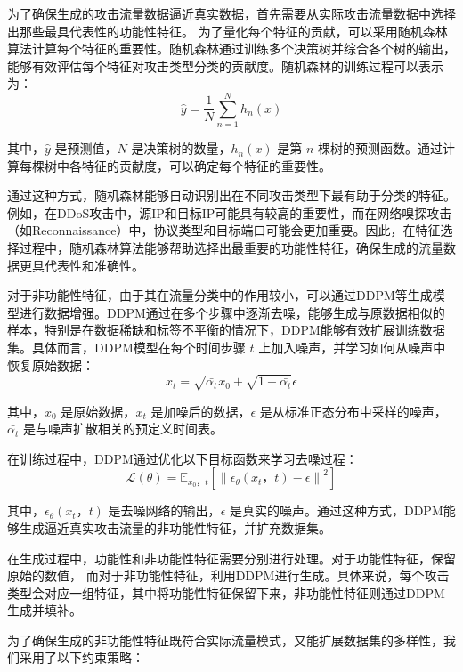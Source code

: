 \documentclass[promaster]{thesis-uestc}
\begin{document}
为了确保生成的攻击流量数据逼近真实数据，首先需要从实际攻击流量数据中选择出那些最具代表性的功能性特征。
为了量化每个特征的贡献，可以采用随机森林算法计算每个特征的重要性。随机森林通过训练多个决策树并综合各个树的输出，能够有效评估每个特征对攻击类型分类的贡献度。随机森林的训练过程可以表示为：
\begin{equation}
\hat{y} = \frac{1}{N} \sum_{n=1}^{N} h_n(x)
\end{equation}

其中，\( \hat{y} \) 是预测值，\( N \) 是决策树的数量，\( h_n(x) \) 是第 \(n\) 棵树的预测函数。通过计算每棵树中各特征的贡献度，可以确定每个特征的重要性。

通过这种方式，随机森林能够自动识别出在不同攻击类型下最有助于分类的特征。例如，在DDoS攻击中，源IP和目标IP可能具有较高的重要性，而在网络嗅探攻击（如Reconnaissance）中，协议类型和目标端口可能会更加重要。因此，在特征选择过程中，随机森林算法能够帮助选择出最重要的功能性特征，确保生成的流量数据更具代表性和准确性。

对于非功能性特征，由于其在流量分类中的作用较小，可以通过DDPM等生成模型进行数据增强。DDPM通过在多个步骤中逐渐去噪，能够生成与原数据相似的样本，特别是在数据稀缺和标签不平衡的情况下，DDPM能够有效扩展训练数据集。具体而言，DDPM模型在每个时间步骤 \(t\) 上加入噪声，并学习如何从噪声中恢复原始数据：
\begin{equation}
x_t = \sqrt{\bar{\alpha_t}} x_0 + \sqrt{1 - \bar{\alpha_t}} \epsilon
\end{equation}

其中，\(x_0\) 是原始数据，\(x_t\) 是加噪后的数据，\(\epsilon\) 是从标准正态分布中采样的噪声，\(\bar{\alpha_t}\) 是与噪声扩散相关的预定义时间表。

在训练过程中，DDPM通过优化以下目标函数来学习去噪过程：
\begin{equation}
\mathcal{L}(\theta) = \mathbb{E}_{x_0， t} \left[ \left\| \epsilon_\theta(x_t， t) - \epsilon \right\|^2 \right]
\end{equation}

其中，\(\epsilon_\theta(x_t， t)\) 是去噪网络的输出，\(\epsilon\) 是真实的噪声。通过这种方式，DDPM能够生成逼近真实攻击流量的非功能性特征，并扩充数据集。

在生成过程中，功能性和非功能性特征需要分别进行处理。对于功能性特征，保留原始的数值，
而对于非功能性特征，利用DDPM进行生成。具体来说，每个攻击类型会对应一组特征，其中将功能性特征保留下来，非功能性特征则通过DDPM生成并填补。

为了确保生成的非功能性特征既符合实际流量模式，又能扩展数据集的多样性，我们采用了以下约束策略：
\end{document}
